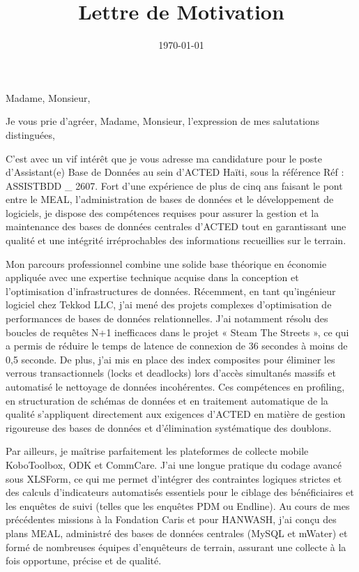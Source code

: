 \documentclass[11pt,a4paper,sans]{moderncv}
\title{Lettre de Motivation}
\begin{document}
\date{\today}
\opening{Madame, Monsieur,}
\closing{Je vous prie d'agréer, Madame, Monsieur, l'expression de mes salutations distinguées,}

\makelettertitle

C'est avec un vif intérêt que je vous adresse ma candidature pour le poste d'Assistant(e) Base de Données au sein d'ACTED Haïti, sous la référence Réf : ASSISTBDD \_ 2607. Fort d'une expérience de plus de cinq ans faisant le pont entre le MEAL, l'administration de bases de données et le développement de logiciels, je dispose des compétences requises pour assurer la gestion et la maintenance des bases de données centrales d'ACTED tout en garantissant une qualité et une intégrité irréprochables des informations recueillies sur le terrain.

Mon parcours professionnel combine une solide base théorique en économie appliquée avec une expertise technique acquise dans la conception et l'optimisation d'infrastructures de données. Récemment, en tant qu'ingénieur logiciel chez Tekkod LLC, j'ai mené des projets complexes d'optimisation de performances de bases de données relationnelles. J'ai notamment résolu des boucles de requêtes N+1 inefficaces dans le projet « Steam The Streets », ce qui a permis de réduire le temps de latence de connexion de 36 secondes à moins de 0,5 seconde. De plus, j'ai mis en place des index composites pour éliminer les verrous transactionnels (locks et deadlocks) lors d'accès simultanés massifs et automatisé le nettoyage de données incohérentes. Ces compétences en profiling, en structuration de schémas de données et en traitement automatique de la qualité s'appliquent directement aux exigences d'ACTED en matière de gestion rigoureuse des bases de données et d'élimination systématique des doublons.

Par ailleurs, je maîtrise parfaitement les plateformes de collecte mobile KoboToolbox, ODK et CommCare. J'ai une longue pratique du codage avancé sous XLSForm, ce qui me permet d'intégrer des contraintes logiques strictes et des calculs d'indicateurs automatisés essentiels pour le ciblage des bénéficiaires et les enquêtes de suivi (telles que les enquêtes PDM ou Endline). Au cours de mes précédentes missions à la Fondation Caris et pour HANWASH, j'ai conçu des plans MEAL, administré des bases de données centrales (MySQL et mWater) et formé de nombreuses équipes d'enquêteurs de terrain, assurant une collecte à la fois opportune, précise et de qualité.
\end{document}
